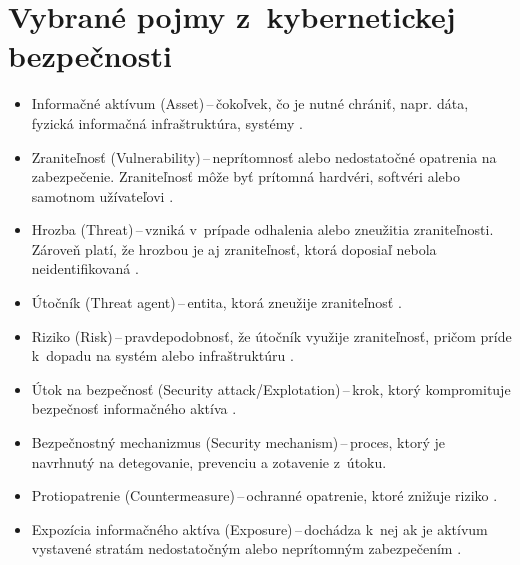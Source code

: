 \section{Vybrané pojmy z~kybernetickej bezpečnosti}
\begin{itemize}
	\item Informačné aktívum (Asset)\,--\,čokoľvek, čo je nutné chrániť, napr. dáta, fyzická informačná infraštruktúra, systémy \cite{McMillan2018}.\\
	
	\item Zraniteľnosť (Vulnerability)\,--\,neprítomnosť alebo nedostatočné opatrenia na zabezpečenie. Zraniteľnosť môže byť prítomná hardvéri, softvéri alebo samotnom užívateľovi \cite{McMillan2018}.\\
	
	\item Hrozba (Threat)\,--\,vzniká v~prípade odhalenia alebo zneužitia zraniteľnosti. Zároveň platí, že hrozbou je aj zraniteľnosť, ktorá doposiaľ nebola neidentifikovaná \cite{McMillan2018}.\\
	
	\item Útočník (Threat agent)\,--\,entita, ktorá zneužije zraniteľnosť \cite{McMillan2018}.\\
    
    \item Riziko (Risk)\,--\,pravdepodobnosť, že útočník využije zraniteľnosť, pričom príde k~dopadu na systém alebo infraštruktúru \cite{McMillan2018}.\\
  	
  	\item Útok na bezpečnosť (Security attack/Explotation)\,--\,krok, ktorý kompromituje bezpečnosť informačného aktíva \cite{Vyncke2008}.\\
  	    
	\item Bezpečnostný mechanizmus (Security mechanism)\,--\,proces, ktorý je navrhnutý na detegovanie, prevenciu a zotavenie z~útoku. \\
	
	\item Protiopatrenie (Countermeasure)\,--\,ochranné opatrenie, ktoré znižuje riziko \cite{McMillan2018}.\\
	
	\item Expozícia informačného aktíva (Exposure)\,--\,dochádza k~nej ak je aktívum vystavené stratám nedostatočným alebo neprítomným zabezpečením \cite{McMillan2018}.\\
	
\end{itemize}


